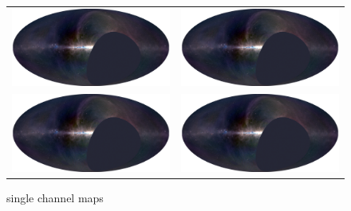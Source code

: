 \documentclass[twocolumn]{aastex6}
\begin{document}
\begin{figure}[ht]
\begin{tabular}{cc}
        \includegraphics[width=\columnwidth, draft]{maps/rgb-map} &
        \includegraphics[width=\columnwidth, draft]{maps/rgb-map} \\
        \includegraphics[width=\columnwidth, draft]{maps/rgb-map} &
        \includegraphics[width=\columnwidth, draft]{maps/rgb-map} \\
    \end{tabular}
    \caption{single channel maps}
\end{figure}
\end{document}

